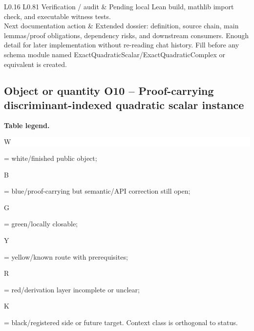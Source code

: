 \begin{longtable}{L{0.16\linewidth} L{0.81\linewidth}}
\hline\addlinespace[0.20em]
Verification /\allowbreak{} audit & Pending local Lean build, mathlib import check, and executable witness tests.\\
\hline\addlinespace[0.20em]
Next documentation action & Extended dossier: definition, source chain, main lemmas/\allowbreak{}proof obligations, dependency risks, and downstream consumers. Enough detail for later implementation without re-reading chat history. Fill before any schema module named ExactQuadraticScalar/\allowbreak{}ExactQuadraticComplex or equivalent is created.\\
\hline\addlinespace[0.20em]
\end{longtable}
\subsection*{Object or quantity O10 -- Proof-carrying discriminant-indexed quadratic scalar instance}
\hypertarget{objproof:O10}{}
\par\smallskip\noindent\begin{minipage}{0.99\linewidth}\footnotesize\raggedright\textbf{Table legend.} \colorbox{white}{\strut W} = white/finished public object; \colorbox{cyan!20}{\strut B} = blue/proof-carrying but semantic/API correction still open; \colorbox{green!18}{\strut G} = green/locally closable; \colorbox{yellow!25}{\strut Y} = yellow/known route with prerequisites; \colorbox{red!20}{\strut R} = red/derivation layer incomplete or unclear; \colorbox{black!18}{\strut K} = black/registered side or future target. Context class is orthogonal to status.\end{minipage}\par\vspace{0.25em}
